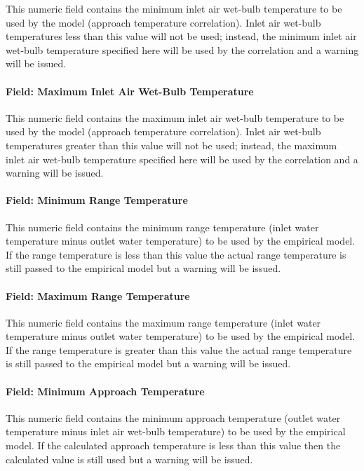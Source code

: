 This numeric field contains the minimum inlet air wet-bulb temperature to be used by the model (approach temperature correlation). Inlet air wet-bulb temperatures less than this value will not be used; instead, the minimum inlet air wet-bulb temperature specified here will be used by the correlation and a warning will be issued.

\paragraph{Field: Maximum Inlet Air Wet-Bulb Temperature}\label{field-maximum-inlet-air-wet-bulb-temperature}

This numeric field contains the maximum inlet air wet-bulb temperature to be used by the model (approach temperature correlation). Inlet air wet-bulb temperatures greater than this value will not be used; instead, the maximum inlet air wet-bulb temperature specified here will be used by the correlation and a warning will be issued.

\paragraph{Field: Minimum Range Temperature}\label{field-minimum-range-temperature}

This numeric field contains the minimum range temperature (inlet water temperature minus outlet water temperature) to be used by the empirical model. If the range temperature is less than this value the actual range temperature is still passed to the empirical model but a warning will be issued.

\paragraph{Field: Maximum Range Temperature}\label{field-maximum-range-temperature}

This numeric field contains the maximum range temperature (inlet water temperature minus outlet water temperature) to be used by the empirical model. If the range temperature is greater than this value the actual range temperature is still passed to the empirical model but a warning will be issued.

\paragraph{Field: Minimum Approach Temperature}\label{field-minimum-approach-temperature}

This numeric field contains the minimum approach temperature (outlet water temperature minus inlet air wet-bulb temperature) to be used by the empirical model. If the calculated approach temperature is less than this value then the calculated value is still used but a warning will be issued.


